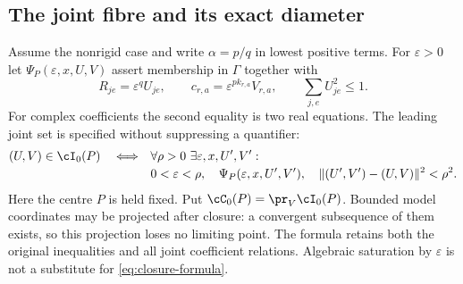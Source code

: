 \subsection{The joint fibre and its exact diameter}
Assume the nonrigid case and write $\alpha=p/q$ in lowest positive terms.
For $\varepsilon>0$ let $\Psi_P(\varepsilon,x,U,V)$ assert membership in
$\Gamma$ together with
\begin{equation}\label{eq:weighted}
 R_{je}=\varepsilon^q U_{je},\qquad
 c_{r,a}=\varepsilon^{p k_{r,a}}V_{r,a},\qquad
 \sum_{j,e}U_{je}^2\le1.
\end{equation}
For complex coefficients the second equality is two real equations.
The leading joint set is specified without suppressing a quantifier:
\begin{align}
 (U,V)\in\cI_0(P)\quad\Longleftrightarrow\quad
 &\forall\rho>0\ \exists\varepsilon,x,U',V':\nonumber\\[-2pt]
 &0<\varepsilon<\rho,\quad
 \Psi_P(\varepsilon,x,U',V'),\quad
 \|(U',V')-(U,V)\|^2<\rho^2.                 \label{eq:closure-formula}
\end{align}
Here the centre $P$ is held fixed. Put $\cC_0(P)=\pr_V\cI_0(P)$.
Bounded model coordinates may be projected after closure: a convergent
subsequence of them exists, so this projection loses no limiting point.
The formula retains both the original inequalities and all joint
coefficient relations. Algebraic saturation by $\varepsilon$ is not a
substitute for \eqref{eq:closure-formula}.

